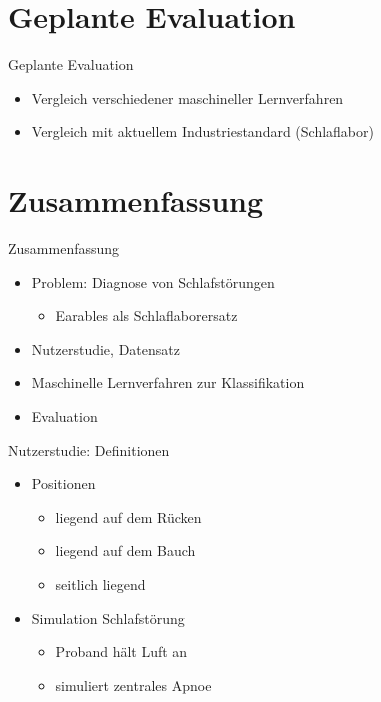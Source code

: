 \documentclass[18pt]{beamer}
\begin{document}
\section{Geplante Evaluation}
\begin{frame}{Geplante Evaluation}
\begin{itemize}
	\item Vergleich verschiedener maschineller Lernverfahren
	\item Vergleich mit aktuellem Industriestandard (Schlaflabor)
\end{itemize}
\end{frame}

\section{Zusammenfassung}
\begin{frame}{Zusammenfassung}
	\begin{itemize}
		\item Problem: Diagnose von Schlafstörungen
		\begin{itemize}
			\item Earables als Schlaflaborersatz
		\end{itemize}
		\item Nutzerstudie, Datensatz
		\item Maschinelle Lernverfahren zur Klassifikation
		\item Evaluation
	\end{itemize}
\end{frame}

\begin{frame}{Nutzerstudie: Definitionen}
	\begin{itemize}
		\item Positionen
		\begin{itemize}
			\item liegend auf dem Rücken
			\item liegend auf dem Bauch
			\item seitlich liegend
		\end{itemize}
		\item Simulation Schlafstörung
		\begin{itemize}
			\item Proband hält Luft an
			\item simuliert zentrales Apnoe
		\end{itemize}
	\end{itemize}
	\end{frame}
	
\end{document}
